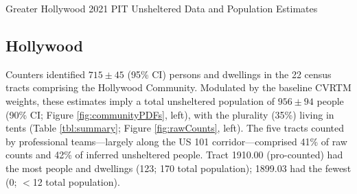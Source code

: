 \documentclass[11pt,twocolumn]{article}
\def\nch{715}
\def\nh{956\pm94}
\begin{document}

\begin{table}[t!]
\caption{Greater Hollywood 2021 PIT Unsheltered Data and Population Estimates}
\caption*{Parentheses denote 90\% uncertainties 
(binomial for categories). Uncertainties larger than estimates imply only upper limits are available. Marginalized
upper limits imply $<$3 unaccompanied minors and families in either community.}%
\label{tbl:summary}
\end{table}

\subsection{Hollywood}
\label{sec:hWood}

Counters identified $\nch\pm45$ (95\% CI) persons and dwellings in the 22 census tracts 
comprising the Hollywood Community. Modulated by the baseline CVRTM weights, these 
estimates imply a total unsheltered population of $\nh$ people 
(90\% CI; Figure \ref{fig:communityPDFs}, left), with the plurality (35\%) living in tents 
(Table \ref{tbl:summary}; Figure \ref{fig:rawCounts}, left). The five tracts counted by professional 
teams---largely along the US 101 corridor---comprised 41\% of raw counts and 42\% of inferred 
unsheltered people. Tract 1910.00 (pro-counted) had the most people and dwellings (123; 170
total population); 1899.03 had the fewest (0; $<$12 total population). %
\end{document}
